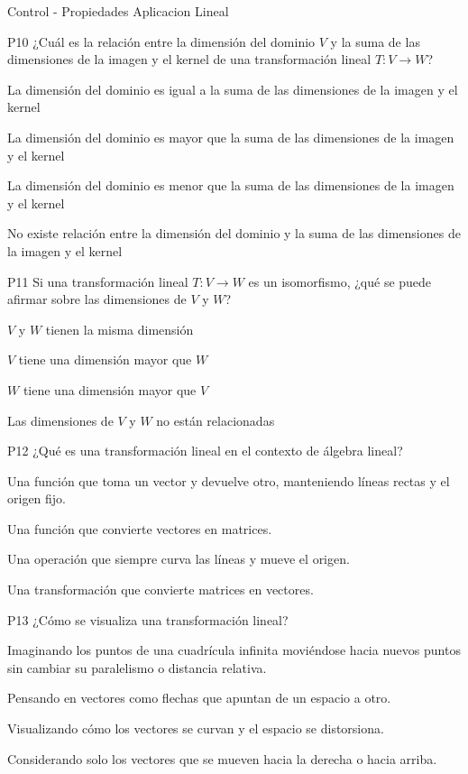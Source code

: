 \documentclass[a4,11pt]{aleph-notas}
\begin{document}
\begin{quiz}{Control - Propiedades Aplicacion Lineal}
\begin{multi}[]%
    {P10}     
    ¿Cuál es la relación entre la dimensión del dominio \(V\) y la suma de las dimensiones de la imagen y el kernel de una transformación lineal \(T: V \rightarrow W\)?     
    \item* La dimensión del dominio es igual a la suma de las dimensiones de la imagen y el kernel     
    \item La dimensión del dominio es mayor que la suma de las dimensiones de la imagen y el kernel     
    \item La dimensión del dominio es menor que la suma de las dimensiones de la imagen y el kernel     
    \item No existe relación entre la dimensión del dominio y la suma de las dimensiones de la imagen y el kernel
\end{multi}

\begin{multi}[]%
    {P11}     
    Si una transformación lineal \(T: V \rightarrow W\) es un isomorfismo, ¿qué se puede afirmar sobre las dimensiones de \(V\) y \(W\)?     
    \item* \(V\) y \(W\) tienen la misma dimensión     
    \item \(V\) tiene una dimensión mayor que \(W\)     
    \item \(W\) tiene una dimensión mayor que \(V\)     
    \item Las dimensiones de \(V\) y \(W\) no están relacionadas
\end{multi}

\begin{multi}[]%
    {P12}     
    ¿Qué es una transformación lineal en el contexto de álgebra lineal?     
    \item* Una función que toma un vector y devuelve otro, manteniendo líneas rectas y el origen fijo.     
    \item Una función que convierte vectores en matrices.     
    \item Una operación que siempre curva las líneas y mueve el origen.     
    \item Una transformación que convierte matrices en vectores.
\end{multi}

\begin{multi}[]%
    {P13}     
    ¿Cómo se visualiza una transformación lineal?     
    \item* Imaginando los puntos de una cuadrícula infinita moviéndose hacia nuevos puntos sin cambiar su paralelismo o distancia relativa.     
    \item Pensando en vectores como flechas que apuntan de un espacio a otro.     
    \item Visualizando cómo los vectores se curvan y el espacio se distorsiona.     
    \item Considerando solo los vectores que se mueven hacia la derecha o hacia arriba.
\end{multi}


\end{quiz}
\end{document}

